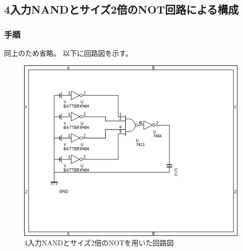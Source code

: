 \documentclass{jsarticle}
\begin{document}
\subsection{4入力NANDとサイズ2倍のNOT回路による構成}
\subsubsection{手順}
    同上のため省略。
    以下に回路図を示す。
    \begin{figure}[H]
        \centering
        \includegraphics[bb=0 0 500 400]{ex3_nand_not.png}
        \caption{4入力NANDとサイズ2倍のNOTを用いた回路図}
    \end{figure}
\end{document}
